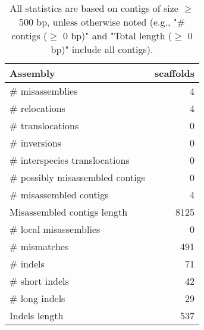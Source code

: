 \documentclass[12pt,a4paper]{article}
\begin{document}
\begin{table}[ht]
\begin{center}
\caption{All statistics are based on contigs of size $\geq$ 500 bp, unless otherwise noted (e.g., "\# contigs ($\geq$ 0 bp)" and "Total length ($\geq$ 0 bp)" include all contigs).}
\begin{tabular}{|l*{1}{|r}|}
\hline
Assembly & scaffolds \\ \hline
\# misassemblies & 4 \\ \hline
\hspace{5mm}\# relocations & 4 \\ \hline
\hspace{5mm}\# translocations & 0 \\ \hline
\hspace{5mm}\# inversions & 0 \\ \hline
\hspace{5mm}\# interspecies translocations & 0 \\ \hline
\# possibly misassembled contigs & 0 \\ \hline
\# misassembled contigs & 4 \\ \hline
Misassembled contigs length & 8125 \\ \hline
\# local misassemblies & 0 \\ \hline
\# mismatches & 491 \\ \hline
\# indels & 71 \\ \hline
\hspace{5mm}\# short indels & 42 \\ \hline
\hspace{5mm}\# long indels & 29 \\ \hline
Indels length & 537 \\ \hline
\end{tabular}
\end{center}
\end{table}
\end{document}
